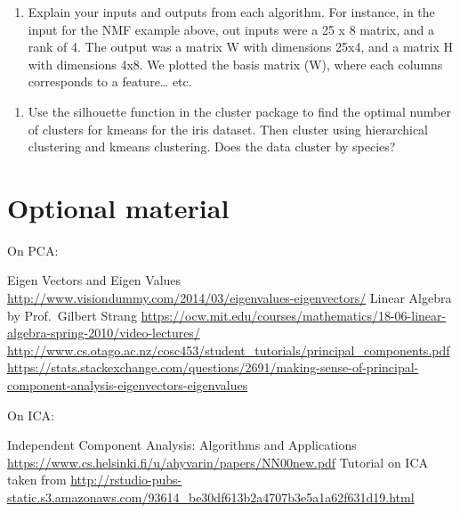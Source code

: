 \documentclass[11pt,]{article}
\providecommand{\tightlist}{%
  \setlength{\itemsep}{0pt}\setlength{\parskip}{0pt}}
\begin{document}
\begin{enumerate}
\def\labelenumi{\alph{enumi}.}
\tightlist
\item
  Explain your inputs and outputs from each algorithm. For instance, in
  the input for the NMF example above, out inputs were a 25 x 8 matrix,
  and a rank of 4. The output was a matrix W with dimensions 25x4, and a
  matrix H with dimensions 4x8. We plotted the basis matrix (W), where
  each columns corresponds to a feature\ldots{} etc.
\end{enumerate}

\begin{enumerate}
\def\labelenumi{\arabic{enumi}.}
\setcounter{enumi}{1}
\tightlist
\item
  Use the silhouette function in the cluster package to find the optimal
  number of clusters for kmeans for the iris dataset. Then cluster using
  hierarchical clustering and kmeans clustering. Does the data cluster
  by species?
\end{enumerate}

\hypertarget{optional-material}{%
\section{Optional material}\label{optional-material}}

On PCA:

Eigen Vectors and Eigen Values
\url{http://www.visiondummy.com/2014/03/eigenvalues-eigenvectors/}
Linear Algebra by Prof.~Gilbert Strang
\url{https://ocw.mit.edu/courses/mathematics/18-06-linear-algebra-spring-2010/video-lectures/}
\url{http://www.cs.otago.ac.nz/cosc453/student_tutorials/principal_components.pdf}
\url{https://stats.stackexchange.com/questions/2691/making-sense-of-principal-component-analysis-eigenvectors-eigenvalues}

On ICA:

Independent Component Analysis: Algorithms and Applications
\url{https://www.cs.helsinki.fi/u/ahyvarin/papers/NN00new.pdf} Tutorial
on ICA taken from
\url{http://rstudio-pubs-static.s3.amazonaws.com/93614_be30df613b2a4707b3e5a1a62f631d19.html}
\end{document}
